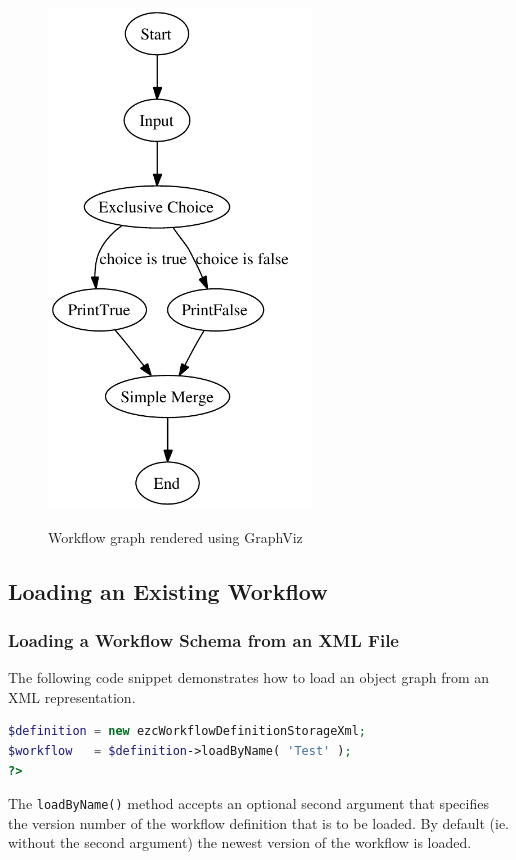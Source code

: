 \begin{figure}[hbt]
\begin{center}
\includegraphics[width=7cm]{figures/GraphVizExample}\\[5mm]
\end{center}
\caption{Workflow graph rendered using GraphViz}
\label{figure-GraphVizExample}
\end{figure}

\subsection{Loading an Existing Workflow}

\subsubsection{Loading a Workflow Schema from an XML File}

The following code snippet demonstrates how to load an object graph from
an XML representation.

\begin{lstlisting}[language=PHP,firstnumber=8]
$definition = new ezcWorkflowDefinitionStorageXml;
$workflow   = $definition->loadByName( 'Test' );
?>
\end{lstlisting}

The \texttt{loadByName()} method accepts an optional second argument that
specifies the version number of the workflow definition that is to be loaded.
By default (ie. without the second argument) the newest version of the workflow
is loaded.

